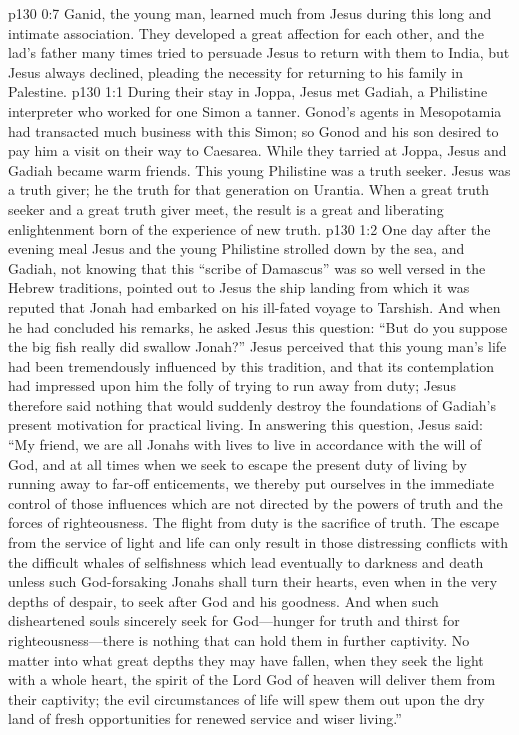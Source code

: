 \vs p130 0:7 Ganid, the young man, learned much from Jesus during this long and intimate association. They developed a great affection for each other, and the lad’s father many times tried to persuade Jesus to return with them to India, but Jesus always declined, pleading the necessity for returning to his family in Palestine.
\vs p130 1:1 During their stay in Joppa, Jesus met Gadiah, a Philistine interpreter who worked for one Simon a tanner. Gonod’s agents in Mesopotamia had transacted much business with this Simon; so Gonod and his son desired to pay him a visit on their way to Caesarea. While they tarried at Joppa, Jesus and Gadiah became warm friends. This young Philistine was a truth seeker. Jesus was a truth giver; he  the truth for that generation on Urantia. When a great truth seeker and a great truth giver meet, the result is a great and liberating enlightenment born of the experience of new truth.
\vs p130 1:2 One day after the evening meal Jesus and the young Philistine strolled down by the sea, and Gadiah, not knowing that this “scribe of Damascus” was so well versed in the Hebrew traditions, pointed out to Jesus the ship landing from which it was reputed that Jonah had embarked on his ill\hyp{}fated voyage to Tarshish. And when he had concluded his remarks, he asked Jesus this question: “But do you suppose the big fish really did swallow Jonah?” Jesus perceived that this young man’s life had been tremendously influenced by this tradition, and that its contemplation had impressed upon him the folly of trying to run away from duty; Jesus therefore said nothing that would suddenly destroy the foundations of Gadiah’s present motivation for practical living. In answering this question, Jesus said: \textcolor{ubdarkred}{“My friend, we are all Jonahs with lives to live in accordance with the will of God, and at all times when we seek to escape the present duty of living by running away to far\hyp{}off enticements, we thereby put ourselves in the immediate control of those influences which are not directed by the powers of truth and the forces of righteousness. The flight from duty is the sacrifice of truth. The escape from the service of light and life can only result in those distressing conflicts with the difficult whales of selfishness which lead eventually to darkness and death unless such God\hyp{}forsaking Jonahs shall turn their hearts, even when in the very depths of despair, to seek after God and his goodness. And when such disheartened souls sincerely seek for God---hunger for truth and thirst for righteousness---there is nothing that can hold them in further captivity. No matter into what great depths they may have fallen, when they seek the light with a whole heart, the spirit of the Lord God of heaven will deliver them from their captivity; the evil circumstances of life will spew them out upon the dry land of fresh opportunities for renewed service and wiser living.”}
